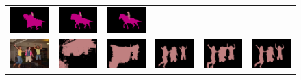 \begin{figure}[!htbp]
{\begin{tabular}{c c c c c c}
    \includegraphics[height=0.11\linewidth]{fig/val_crf_vis/bbox_crf/2007_003022.png} &
    \includegraphics[height=0.11\linewidth]{fig/val_crf_vis/strongweak/2007_003022.png} &
    \includegraphics[height=0.11\linewidth]{fig/val_crf_vis/cocomix/2007_003022.png} \\
    \includegraphics[height=0.123\linewidth]{fig/val_crf_vis/img/2008_003546.jpg} &
    \includegraphics[height=0.123\linewidth]{fig/val_crf_vis/adaweak/2008_003546.png} &
    \includegraphics[height=0.123\linewidth]{fig/val_crf_vis/bbox/2008_003546.png} &
    \includegraphics[height=0.123\linewidth]{fig/val_crf_vis/bbox_crf/2008_003546.png} &
    \includegraphics[height=0.123\linewidth]{fig/val_crf_vis/strongweak/2008_003546.png} &
    \includegraphics[height=0.123\linewidth]{fig/val_crf_vis/cocomix/2008_003546.png} \\

\end{tabular}}
\end{figure}
